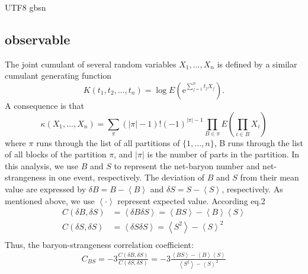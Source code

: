 \documentclass[twocolumn,showpacs,preprintnumbers,amsmath,amssymb]{revtex4-1}
\begin{document}
\begin{CJK*} {UTF8} {gbsn}
\begin{appendices}
	\section{observable} 
	The joint cumulant of several random variables $X_{1}, ..., X_{n}$ is defined by a similar cumulant generating function
	\begin{equation}
K\left(t_{1}, t_{2}, \ldots, t_{n}\right)=\log E\left(\mathrm{e}^{\sum_{j=1}^{n} t_{j} X_{j}}\right).
\end{equation}
	 A consequence is that
	 \begin{equation}
\kappa\left(X_{1}, \ldots, X_{n}\right)=\sum_{\pi}(|\pi|-1) !(-1)^{|\pi|-1} \prod_{B \in \pi} E\left(\prod_{i \in B} X_{i}\right)
\end{equation}
where $\pi$ runs through the list of all partitions of $\{ 1, ..., n \}$, B runs through the list of all blocks of the partition $\pi$, and $|\pi|$ is the number of parts in the partition.
In this analysis, we use $B$ and $S$ to represent the net-baryon number and net-strangeness in one event, respectively.
The deviation of $B$ and $S$ from their mean value are expressed by $\delta B = B - \left\langle B \right\rangle$ and $\delta S = S -\left\langle S \right\rangle$, respectively. 
As mentioned above, we use $\left\langle \cdot \right\rangle$ represent expected value.
 According eq.2
\begin{equation}
\begin{aligned}
C(\delta B,\delta S) &=  \left\langle \delta B \delta S \right\rangle = \left\langle BS \right\rangle - \left\langle B \right\rangle \left\langle S \right\rangle\\
C(\delta S,\delta S) &=  \left\langle \delta S \delta S \right\rangle = \left\langle S^{2} \right\rangle - \left\langle S \right\rangle^{2}\\
			\end{aligned}
\end{equation}
Thus, the baryon-strangeness correlation coefficient:
\begin{equation}
\begin{aligned}
C_{BS} = -3\frac{C(\delta B,\delta S)}{C(\delta S,\delta S)} = -3\frac{\left\langle BS \right\rangle - \left\langle B \right\rangle \left\langle S \right\rangle}{\left\langle S^{2}  \right\rangle - \left\langle S \right\rangle^{2}}
			\end{aligned}
\end{equation}
\end{appendices}
	

\end{CJK*}
\end{document}
